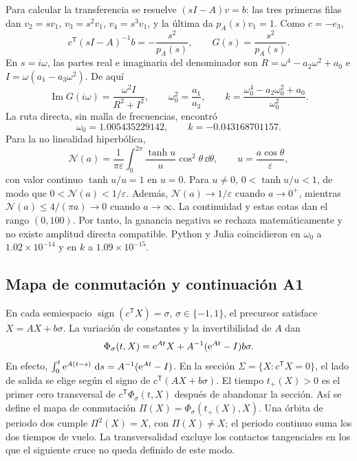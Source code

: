 Para calcular la transferencia se resuelve \((sI-A)v=b\): las tres primeras
filas dan \(v_2=sv_1\), \(v_3=s^2v_1\), \(v_4=s^3v_1\), y la última da
\(p_A(s)v_1=1\). Como \(c=-e_3\),
\[
 c^{\mathsf T}(sI-A)^{-1}b=-\frac{s^2}{p_A(s)},\qquad
 G(s)=\frac{s^2}{p_A(s)}.
\]
En \(s=i\omega\), las partes real e imaginaria del denominador son
\(R=\omega^4-a_2\omega^2+a_0\) e
\(I=\omega(a_1-a_3\omega^2)\). De aquí
\[
 \operatorname{Im}G(i\omega)=\frac{\omega^2I}{R^2+I^2},\qquad
 \omega_0^2=\frac{a_1}{a_3},\qquad
 k=\frac{\omega_0^4-a_2\omega_0^2+a_0}{\omega_0^2}.
\]
La ruta directa, sin malla de frecuencias, encontró
\[
 \omega_0=1.005435229142,\qquad k=-0.043168701157.
\]
Para la no linealidad hiperbólica,
\[
 \mathcal N(a)=\frac1{\pi\varepsilon}\int_0^{2\pi}
  \frac{\tanh u}{u}\cos^2\theta\,\dd\theta,
 \qquad u=\frac{a\cos\theta}{\varepsilon},
\]
con valor continuo \(\tanh u/u=1\) en \(u=0\). Para \(u\ne0\),
\(0<\tanh u/u<1\), de modo que \(0<\mathcal N(a)<1/\varepsilon\).
Además, \(\mathcal N(a)\to1/\varepsilon\) cuando \(a\to0^+\), mientras
\(\mathcal N(a)\leq4/(\pi a)\to0\) cuando \(a\to\infty\). La continuidad
y estas cotas dan el rango \((0,100)\).
Por tanto, la ganancia negativa se rechaza matemáticamente y no
existe amplitud directa compatible. Python y Julia coincidieron en
\(\omega_0\) a \(1.02\times10^{-14}\) y en \(k\) a
\(1.09\times10^{-15}\).

\subsection{Mapa de conmutación y continuación A1}

En cada semiespacio \(\operatorname{sign}(c^{\mathsf T}X)=\sigma\),
\(\sigma\in\{-1,1\}\), el precursor satisface \(\dot X=AX+b\sigma\).
La variación de constantes y la invertibilidad de \(A\) dan
\begin{equation}
 \Phi_\sigma(t,X)=\mathrm e^{At}X+
                   A^{-1}(\mathrm e^{At}-I)b\sigma.
 \label{int:eq:kf-switching-flow}
\end{equation}
En efecto, \(\int_0^t\mathrm e^{A(t-s)}\,\,\mathrm d s=A^{-1}(\mathrm e^{At}-I)\). En la
sección \(\Sigma=\{X:c^{\mathsf T}X=0\}\), el lado de salida se elige
según el signo de \(c^{\mathsf T}(AX+b\sigma)\). El tiempo \(t_+(X)>0\)
es el primer cero transversal de
\(c^{\mathsf T}\Phi_\sigma(t,X)\) después de abandonar la sección. Así se
define el mapa de conmutación
\(\Pi(X)=\Phi_\sigma(t_+(X),X)\). Una órbita de periodo dos cumple
\(\Pi^2(X)=X\), con \(\Pi(X)\ne X\); el periodo continuo suma los dos
tiempos de vuelo. La transversalidad excluye los contactos tangenciales en
los que el siguiente cruce no queda definido de este modo.

